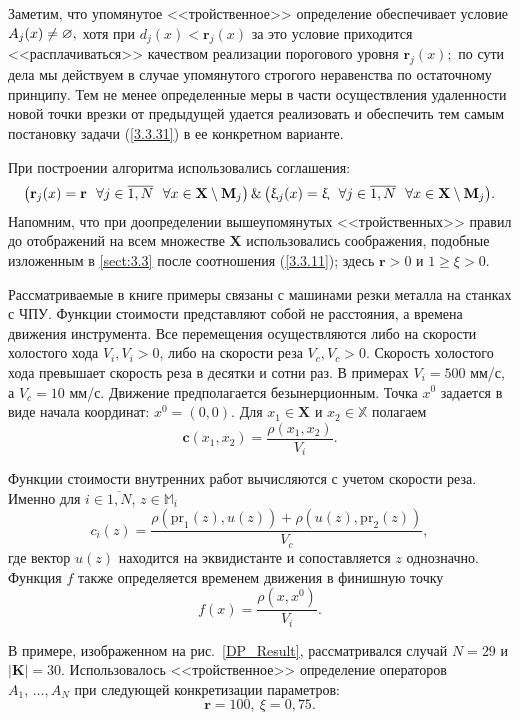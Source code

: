 Заметим, что упомянутое <<тройственное>> определение обеспечивает условие
$A_j(x) \neq \varnothing,$
хотя при $d_j(x) < \mathbf{r}_j(x)$
за это условие приходится <<расплачиваться>> качеством реализации порогового уровня
$\mathbf{r}_j(x);$
по сути дела мы действуем в случае упомянутого строгого
неравенства по остаточному принципу.
Тем не менее определенные меры в части
осуществления удаленности новой точки врезки от предыдущей удается реализовать
и обеспечить тем самым постановку задачи (\ref{3.3.31})
в ее конкретном варианте.

При построении алгоритма использовались соглашения:
$$
  \bigl(\mathbf{r}_j(x) = \mathbf{r}\ \ \fa j\in \ov{1,N}\ \ \fa x\in
  \mathbf{X}\setminus \mathbf{M}_j\bigl)\,\&\,\bigl(\xi_j(x) = \xi\ \ \fa
  j\in \ov{1,N}\ \ \fa x\in \mathbf{X}\setminus \mathbf{M}_j\bigl)
  .
$$
Напомним, что при доопределении вышеупомянутых <<тройственных>> правил до
отображений на всем множестве $\mathbf{X}$ использовались соображения,
подобные изложенным в \ref{sect:3.3}
после соотношения (\ref{3.3.11});
здесь $\mathbf{r}>0$
и $1 \geqslant\xi >0$.

Рассматриваемые в книге примеры связаны с машинами резки металла на станках с ЧПУ.
Функции стоимости представляют собой не расстояния,
а времена движения инструмента.
Все перемещения осуществляются либо на скорости холостого хода $V_i,V_i>0$,
либо на скорости реза
$V_c, V_c > 0$.
Скорость холостого хода превышает скорость
реза в десятки и сотни раз.
В примерах $V_i=500$ мм/с, а $V_c=10$ мм/с.
Движение предполагается безынерционным.
Точка $x^0$ задается в виде начала координат:
$x^0=(0,0)$.
Для
$x_1\in \mathbf{X}$ и
$x_2\in \mathbb{X}$ полагаем
\begin{equation}
  \label{ExtPrice}
  \mathbf{c}(x_1,x_2)=\frac{\rho (x_1,x_2)}{V_i}
  .
\end{equation}

Функции стоимости внутренних работ вычисляются с учетом скорости реза.
Именно для
$i\in \overline{1,N}$, $z\in \mathbb{M}_i$
$$
  c_i(z)=\frac{\rho(\mbox{pr}_1(z),u(z))+\rho(u(z),\mbox{pr}_2(z))}{V_c}
  ,
$$
где вектор $u(z)$
находится на эквидистанте и сопоставляется $z$ однозначно.
Функция $f$
также определяется временем движения в финишную точку
\begin{equation}
  \label{TerminalPrice}
  f(x)=\frac{\rho (x,x^0)}{V_i}
  .
\end{equation}

В примере,
изображенном на рис.~\ref{DP_Result},
рассматривался случай
\mbox{$N=29$} и
$|\mathbf{K}| =30$.
Использовалось <<тройственное>> определение операторов
$A_1,\,\ldots,A_N$
при следующей конкретизации параметров:
$$
  \mathbf{r}=100,\ \xi=0,75
  .
$$

